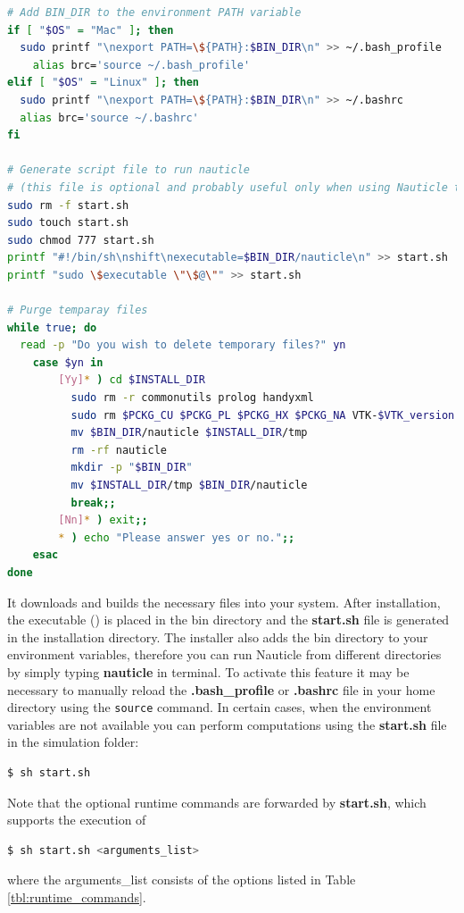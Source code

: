 \documentclass[a4paper,12pt,openany]{book}
\theoremstyle{break}
\begin{document}
\begin{example}{\installer{}}{}
\begin{lstlisting}[language=bash]
# Add BIN_DIR to the environment PATH variable
if [ "$OS" = "Mac" ]; then
  sudo printf "\nexport PATH=\${PATH}:$BIN_DIR\n" >> ~/.bash_profile
    alias brc='source ~/.bash_profile'
elif [ "$OS" = "Linux" ]; then
  sudo printf "\nexport PATH=\${PATH}:$BIN_DIR\n" >> ~/.bashrc
  alias brc='source ~/.bashrc'
fi

# Generate script file to run nauticle
# (this file is optional and probably useful only when using Nauticle through ssh)
sudo rm -f start.sh
sudo touch start.sh
sudo chmod 777 start.sh
printf "#!/bin/sh\nshift\nexecutable=$BIN_DIR/nauticle\n" >> start.sh
printf "sudo \$executable \"\$@\"" >> start.sh

# Purge temparay files
while true; do
  read -p "Do you wish to delete temporary files?" yn
    case $yn in
        [Yy]* ) cd $INSTALL_DIR
          sudo rm -r commonutils prolog handyxml
          sudo rm $PCKG_CU $PCKG_PL $PCKG_HX $PCKG_NA VTK-$VTK_version.zip
          mv $BIN_DIR/nauticle $INSTALL_DIR/tmp
          rm -rf nauticle
          mkdir -p "$BIN_DIR"
          mv $INSTALL_DIR/tmp $BIN_DIR/nauticle
          break;;
        [Nn]* ) exit;;
        * ) echo "Please answer yes or no.";;
    esac
done
\end{lstlisting}
\end{example}

It downloads and builds the necessary files into your system. After installation, the executable (\execname{}) is placed in the bin directory and the \textbf{start.sh} file is generated in the installation directory. The installer also adds the bin directory to your environment variables, therefore you can run Nauticle from different directories by simply typing \textbf{nauticle} in terminal. To activate this feature it may be necessary to manually reload the \textbf{.bash\_profile} or \textbf{.bashrc} file in your home directory using the \texttt{source} command.
In certain cases, when the environment variables are not available you can perform computations using the \textbf{start.sh} file in the simulation folder:
\begin{lstlisting}[language=bash]
  $ sh start.sh
\end{lstlisting}
Note that the optional runtime commands are forwarded by \textbf{start.sh}, which supports the execution of
\begin{lstlisting}[language=bash]
  $ sh start.sh <arguments_list>
\end{lstlisting}
where the arguments\_list consists of the options listed in Table \ref{tbl:runtime_commands}.
\end{document}
